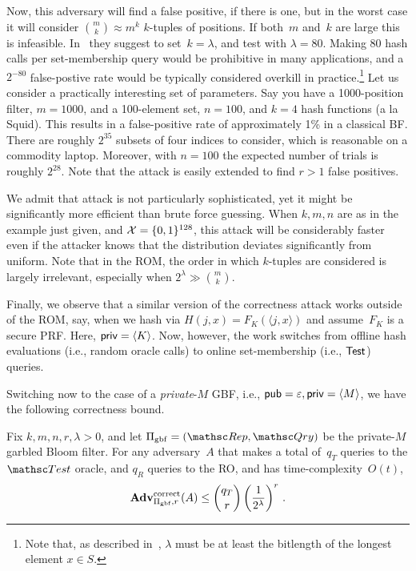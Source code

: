 Now, this adversary will find a false positive, if there is one, but in the worst case it will consider
$\binom{m}{k} \approx m^k$ $k$-tuples of positions.  If both~$m$
and~$k$ are large this is infeasible.  In~\cite{xxx} they suggest to
set~$k=\lambda$, and test with $\lambda=80$.  Making 80 hash calls per
set-membership query would be prohibitive in many applications, and a
$2^{-80}$ false-postive rate would be typically considered overkill in
practice.\footnote{Note
that, as described in~\cite{xxx}, $\lambda$ must be at least the
bitlength of the longest element $x \in S$. }
Let us consider a practically interesting set of parameters. Say you have a 1000-position
filter, $m=1000$, and a 100-element set, $n=100$,  and $k=4$ hash
functions (a la Squid\cite{squid}).  This results in a false-positive rate of
approximately 1\% in a classical BF.  There are roughly $2^{35}$
subsets of four indices to consider, which is reasonable on a
commodity laptop.  Moreover, with $n=100$ the expected
number of trials is roughly $2^{28}$.
Note that the attack is easily extended to find $r>1$ false positives.

We admit that attack is not particularly sophisticated, yet it might
be significantly more efficient than brute force guessing.  When $k,m,n$ are as in the example just given, and ${\cal X}=\{0,1\}^{128}$, 
this attack will be considerably faster even if the attacker knows that the distribution deviates significantly from uniform.   Note that in the ROM, the order in which $k$-tuples are considered is largely irrelevant, especially when $2^\lambda \gg \binom{m}{k}$.

Finally, we observe that a similar version of the correctness attack
works outside of the ROM, say, when we hash via $H(j,x)=F_K(\langle
j,x \rangle)$ and assume~$F_K$ is a secure PRF.  Here,
${\sf priv}=\langle K \rangle$.  Now,
however, the work switches from offline hash evaluations (i.e., random
oracle calls) to online set-membership (i.e., $\mathsf{Test}$) queries.


Switching now to the case of a \emph{private}-$M$ GBF, i.e., ${\sf pub}=\varepsilon, {\sf priv}=\langle M \rangle$, we have the
following correctness bound.

\begin{theorem}
Fix $k,m,n,r,\lambda>0$, and let $\setprim_{\mathrm{gbf}}=(\Rep, \Qry)$ be the private-$M$ garbled Bloom filter. For any adversary~$A$ that makes a total of~$q_T$ queries to the $\Test$ oracle, and $q_R$ queries to the RO, and has time-complexity~$O(t)$,
\[
\mathrm{\mathbf{Adv}}^{\mathrm{correct}}_{\Pi_{\mathrm{gbf}},r}(A) \leq  {\dbinom{q_T}{r}} \left( \dfrac{1}{2^{\lambda}} \right)^r\,.
\]
\end{theorem}

